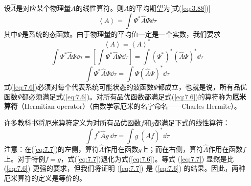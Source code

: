     设$\hat{A}$是对应某个物理量$A$的线性算符。则$A$的平均期望为[式(\ref{eq:3.88})]
    \begin{equation*}
        \left\langle A \right\rangle = \int \Psi^{\ast} \hat{A} \Psi \dd \tau
    \end{equation*}
    其中$\Psi$是系统的态函数。由于物理量的平均值一定是一个实数，我们要求
    \begin{equation*}
        \left\langle A \right\rangle = \left\langle A \right\rangle^{\ast}
    \end{equation*}
    \begin{equation*}
        \int \Psi^{\ast} \hat{A} \Psi \dd \tau = \left[\int \Psi^{\ast}\hat{A}\Psi\dd \tau\right] = \int \left(\Psi^{\ast}\right)^{\ast} \left(\hat{A}\Psi\right)^{\ast}\dd \tau
    \end{equation*}
    \begin{equation}
        \int \Psi^{\ast} \hat{A} \Psi \dd \tau = \int \Psi  \left(\hat{A}\Psi\right)^{\ast} \dd \tau
        \label{eq:7.6}
    \end{equation}
    式(\ref{eq:7.6})必须对每个代表系统可能状态的波函数$\Psi$都成立，也就是说，所有品优函数$\Psi$都必须满足式(\ref{eq:7.6})。对所有品优函数都满足式(\ref{eq:7.6})的算符称为\textbf{厄米算符}（Hermitian operator）（由数学家厄米的名字命名——Charles Hermite）。

    许多教科书将厄米算符定义为对所有品优函数$f$和$g$都满足下式的线性算符：
    \begin{equation}
        \int f^{\ast} \hat{A} g \:\dd \tau = \int g \:\left(\hat{A} f\right)^{\ast} \dd \tau
        \label{eq:7.7}
    \end{equation}
    注意：在(\ref{eq:7.7})的左侧，算符$\hat{A}$作用在函数$g$上；而在右侧，算符$\hat{A}$作用在函数$f$上。对于特例$f=g$，式(\ref{eq:7.7})退化为式(\ref{eq:7.6})。等式 (\ref{eq:7.7}) 显然是比 (\ref{eq:7.6}) 更强的要求，但我们将证明 (\ref{eq:7.7}) 是 (\ref{eq:7.6}) 的结果。因此，两种厄米算符的定义是等价的。

